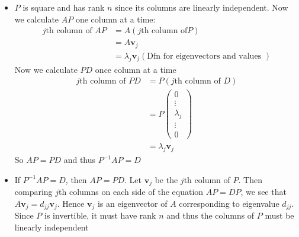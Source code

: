 \documentclass{report}
\begin{document}
\begin{myproof}[]
    \begin{itemize}
        \item $P$ is square and has rank  $n$ since its columns are linearly independent. Now we calculate  $AP$ one column at a time: \\
             \[
            \begin{aligned}
                j \text{th column of } AP  & = A\left( j \text{th column of} P \right) \\
                 & = A\mathbf{v}_j \\
                 & = \lambda _j \mathbf{v}_j \left( \text{Dfn for eigenvectors and values }   \right) 
            \end{aligned}
            \]
        Now we calculate $PD$ once column at a time \\
         \[
        \begin{aligned}
            j\text{th column of } PD  & = P\left( j\text{th column of } D \right) \\
             & = P \begin{pmatrix} 0 \\ \vdots  \\ \lambda _j  \\ \vdots  \\ 0 \end{pmatrix} \\
              & = \lambda _j \mathbf{v}_j
        \end{aligned}
        \]
        So $AP = PD$ and thus  $P^{-1}AP = D$
    \item If $P^{-1}AP = D$, then  $AP=PD$. Let  $\mathbf{v}_j$ be the $j$th column of  $P$. Then comparing  $j$th columns on each side of the equation  $AP=DP$, we see that  $A \mathbf{v}_j = d_{jj}\mathbf{v}_j$. Hence $\mathbf{v}_j$ is an eigenvector of $A$ corresponding to eigenvalue  $d_{jj}$. Since  $P$ is invertible, it must have rank  $n$ and thus the columns of  $P$ must be linearly independent
    \end{itemize}
\end{myproof}
\end{document}
